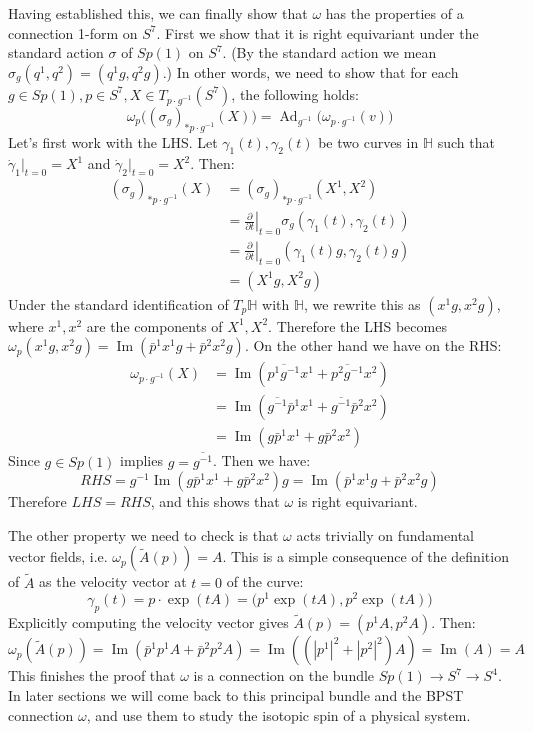 \documentclass{book}
\newcommand{\HH}{\mathbb{H}}
\newcommand{\p}{\partial}
\DeclareMathOperator{\Imag}{Im}
\DeclareMathOperator{\Ad}{Ad}
\theoremstyle{plain}
\theoremstyle{definition}
\theoremstyle{remark}
\begin{document}
Having established this, we can finally show that $\omega$ has the properties of a connection 1-form on $S^7$. First we show that it is right equivariant under the standard action $\sigma$ of $Sp(1)$ on $S^7$. (By the standard action we mean $\sigma_g(q^1, q^2) = (q^1 g, q^2 g)$.) In other words, we need to show that for each $g \in Sp(1), p \in S^7, X \in T_{p \cdot g^{-1}}(S^7)$, the following holds:
\[     \omega_p\big((\sigma_g)_{*p\cdot g^{-1}}(X)\big) = \Ad_{g^{-1}}\big(\omega_{p\cdot g^{-1}} (v)\big)   \]
Let's first work with the LHS. Let $\gamma_1(t), \gamma_2(t)$ be two curves in $\HH$ such that $\dot \gamma_1|_{t=0} = X^1$ and $\dot \gamma_2|_{t=0} = X^2$. Then:
\begin{align*}      
(\sigma_g)_{*p\cdot g^{-1}}(X) &= (\sigma_g)_{*p\cdot g^{-1}}(X^1, X^2) \\
&= \left. \frac{\p}{\p t} \right|_{t=0} \sigma_g (\gamma_1(t), \gamma_2(t)) \\
&= \left. \frac{\p}{\p t} \right|_{t=0} (\gamma_1(t) g, \gamma_2(t) g) \\
&= (X^1 g, X^2 g)
\end{align*}
Under the standard identification of $T_p \HH$ with $\HH$, we rewrite this as $(x^1 g, x^2g)$, where $x^1, x^2$ are the components of $X^1, X^2$. Therefore the LHS becomes $\omega_p(x^1 g, x^2g) = \Imag(\bar p^1 x^1 g + \bar p^2 x^2 g)$. On the other hand we have on the RHS:
\begin{align*}
\omega_{p\cdot g^{-1}} (X) &= \Imag(\overline{p^1 g^{-1}}x^1 + \overline{p^2 g^{-1}} x^2) \\
&= \Imag(\overline{g^{-1}} \bar p^1 x^1 + \overline{g^{-1}} \bar p^2 x^2) \\
&= \Imag(g \bar p^1 x^1 + g \bar p^2 x^2)
\end{align*}
Since $g\in Sp(1)$ implies $g = \overline{g^{-1}}$. Then we have:
\[     RHS = g^{-1} \Imag(g \bar p^1 x^1 + g \bar p^2 x^2) g  = \Imag( \bar p^1 x^1 g +  \bar p^2 x^2 g)     \]
Therefore $LHS = RHS$, and this shows that $\omega$ is right equivariant.

The other property we need to check is that $\omega$ acts trivially on fundamental vector fields, i.e. $\omega_p (\tilde A (p)) = A$. This is a simple consequence of the definition of $\tilde A$ as the velocity vector at $t=0$ of the curve:
\[ \gamma_p(t) = p \cdot \exp(tA) =  \big(p^1 \exp(tA) , p^2 \exp(tA)\big) \]
Explicitly computing the velocity vector gives $\tilde A(p) = (p^1 A, p^2 A)$. Then:
\[    \omega_p(\tilde A(p)) = \Imag( \bar p^1 p^1 A + \bar p^2 p^2 A ) = \Imag((|p^1|^2 + |p^2|^2 )A) = \Imag(A) = A   \]
This finishes the proof that $\omega$ is a connection on the bundle $Sp(1) \to S^7 \to S^4$. In later sections we will come back to this principal bundle and the BPST connection $\omega$, and use them to study the isotopic spin of a physical system.
\end{document}
